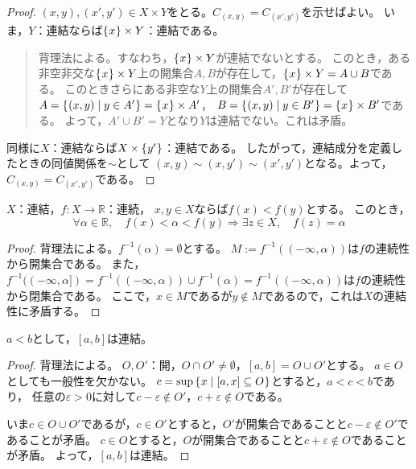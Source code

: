 \documentclass[uplatex]{jsarticle}
\begin{document}
\begin{proof}
  $(x,y), (x', y') \in X \times Y$をとる。$C_{(x,y)} = C_{(x',y')}$を示せばよい。
  いま，$Y$：連結ならば$\Set{\hspace{-1.8pt} x \hspace{-1.8pt}} \times Y$：連結である。
  \begin{quote}
    背理法による。すなわち，$\Set{\hspace{-1.8pt} x \hspace{-1.8pt}} \times Y$が連結でないとする。
    このとき，ある非空非交な$\Set{\hspace{-1.8pt} x \hspace{-1.8pt}} \times Y$上の開集合$A,B$が存在して，$\Set{\hspace{-1.8pt} x \hspace{-1.8pt}} \times Y = A \cup B$である。
    このときさらにある非空な$Y$上の開集合$A',B'$が存在して
    $A = \Set{\hspace{-1.8pt} (x,y) | y \in A' \hspace{-1.8pt}} = \Set{\hspace{-1.8pt} x \hspace{-1.8pt}} \times A'$，
    $B = \Set{\hspace{-1.8pt} (x,y) | y \in B' \hspace{-1.8pt}} = \Set{\hspace{-1.8pt} x \hspace{-1.8pt}} \times B'$である。
    よって，$A' \cup B' = Y$となり$Y$は連結でない。これは矛盾。
  \end{quote}
  同様に$X$：連結ならば$X \times \Set{\hspace{-1.8pt} y' \hspace{-1.8pt}}$：連結である。
  したがって，連結成分を定義したときの同値関係を$\sim$として
  $(x,y) \sim (x, y') \sim (x',y')$となる。よって，$C_{(x,y)} = C_{(x',y')}$である。
\end{proof}

\begin{prop}[中間値の定理]
  $X$：連結，$f \colon X \longrightarrow \mathbb{R}$：連続，
  $x,y \in X$ならば$f(x) < f(y)$とする。
  このとき，
  \begin{equation}
    \forall \alpha \in \mathbb{R}, \quad f(x) < \alpha < f(y) \Longrightarrow \exists z \in X, \quad f(z) = \alpha
  \end{equation}
\end{prop}

\begin{proof}
  背理法による。$f^{-1} (\alpha) = \emptyset$とする。
  $M := f^{-1}((- \infty, \alpha))$は$f$の連続性から開集合である。
  また，$f^{-1}((- \infty, \alpha]) = f^{-1}((- \infty, \alpha)) \cup f^{-1}(\alpha) = f^{-1}((- \infty, \alpha))$は$f$の連続性から閉集合である。
  ここで，$x \in M$であるが$y \notin M$であるので，これは$X$の連結性に矛盾する。
\end{proof}

\begin{hodai}
  $a<b$として，$\left[ a,b \right]$は連結。
\end{hodai}

\begin{proof}
  背理法による。
  $O, O'$：開，$O \cap O' \neq \emptyset$，$\left[ a,b \right] = O \cup O'$とする。
  $a \in O$としても一般性を欠かない。
  $c = \sup \Set{\hspace{-1.8pt} x| \left[ a, x \right] \subseteq O \hspace{-1.8pt}}$とすると，$a < c < b$であり，
  任意の$\varepsilon > 0$に対して$c - \varepsilon \notin O'$，$c + \varepsilon \notin O$である。

  いま$c \in O \cup O'$であるが，$c \in O'$とすると，$O'$が開集合であることと$c - \varepsilon \notin O'$であることが矛盾。
  $c \in O$とすると，$O$が開集合であることと$c + \varepsilon \notin O$であることが矛盾。
  よって，$\left[ a,b \right]$は連結。
\end{proof}
\end{document}
